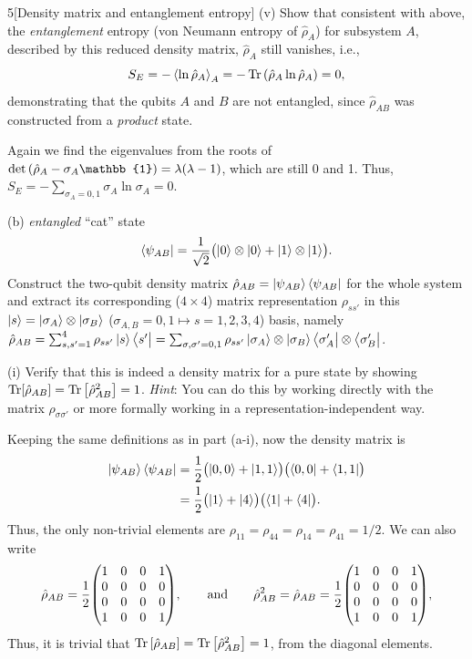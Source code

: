 \documentclass[12pt]{article}
\begin{document}
\begin{problem}{5}[Density matrix and entanglement entropy]
\qquad(v) Show that consistent with above, the \textit{entanglement} entropy
(von Neumann entropy of $\hat\rho_A$) for subsystem $A$, described by this
reduced density matrix, $\hat\rho_A$ still vanishes, i.e.,
\begin{equation}
    S_E=-\expval{\ln\hat\rho_A}_A=-\Tr\qty(\hat\rho_A\ln\hat\rho_A)=0, 
\end{equation}
demonstrating that the qubits $A$ and $B$ are not entangled, since
$\hat\rho_{AB}$ was constructed from a \textit{product} state.
\begin{solution}
    Again we find the eigenvalues from the roots of
    $\det\qty(\hat\rho_A-\sigma_A\mathbb{1})=\lambda(\lambda-1)$, which are
    still 0 and 1. Thus, $S_E=-\sum_{\sigma_A=0,1}\sigma_A\ln\sigma_A=0$.
\end{solution}

(b) \textit{entangled} ``cat'' state
\begin{equation}
    \bra{\psi_{AB}}=\frac1{\sqrt2}\qty(\ket0\otimes\ket0+\ket1\otimes\ket1).
\end{equation}
Construct the two-qubit density matrix
$\hat\rho_{AB}=\ket{\psi_{AB}}\bra{\psi_{AB}}$ for the whole system and extract
its corresponding ($4\times4$) matrix representation $\rho_{ss'}$ in this
$\ket{s}=\ket{\sigma_A}\otimes\ket{\sigma_B}$ ($\sigma_{A,B}=0,1\mapsto
s=1,2,3,4$) basis, namely
$\hat\rho_{AB}=\sum_{s,s'=1}^4\rho_{ss'}\ket{s}\bra{s'}=\sum_{\sigma,\sigma'=0,1}\rho_{ss'}\ket{\sigma_A}\otimes\ket{\sigma_B}\bra{\sigma_A'}\otimes\bra{\sigma_B'}$.

\qquad(i) Verify that this is indeed a density matrix for a pure state by
showing $\Tr[\hat\rho_{AB}]=\Tr\qty[\hat\rho_{AB}^2]=1$. \textit{Hint}: You can
do this by working directly with the matrix $\rho_{\sigma\sigma'}$ or more
formally working in a representation-independent way.
\begin{solution}
Keeping the same definitions as in part (a-i), now the density matrix is
\begin{align}
    \ket{\psi_{AB}}\bra{\psi_{AB}}
    &=\frac12\qty(\ket{0,0}+\ket{1,1})\qty(\bra{0,0}+\bra{1,1})\notag\\
    &=\frac12\qty(\ket{1}+\ket{4})\qty(\bra{1}+\bra{4}).
\end{align}
Thus, the only non-trivial elements are
$\rho_{11}=\rho_{44}=\rho_{14}=\rho_{41}=1/2$. We can also write
\begin{equation}
    \hat\rho_{AB}=\frac12\mqty(1&0&0&1\\0&0&0&0\\0&0&0&0\\1&0&0&1),
    \qquad\t{and}\qquad
    \hat\rho_{AB}^2=\hat{\rho}_{AB}=
    \frac12\mqty(1&0&0&1\\0&0&0&0\\0&0&0&0\\1&0&0&1),
\end{equation}
Thus, it is trivial that $\Tr\qty[\hat\rho_{AB}]=\Tr\qty[\hat\rho_{AB}^2]=1$,
from the diagonal elements.
\end{solution}


\end{problem}
\end{document}
